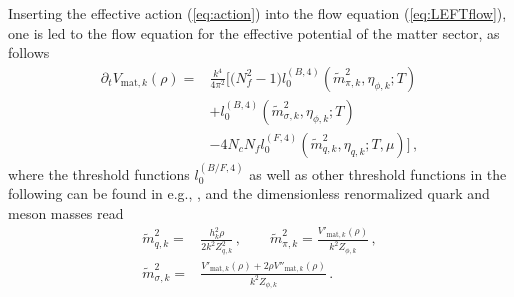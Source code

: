 \documentclass[%
reprint,
superscriptaddress,
showpacs,preprintnumbers,
amsmath,amssymb,
aps,
prd,
]{revtex4-1}
\def\eq#1{(\ref{#1})}
\begin{document}
	Inserting the effective action \eq{eq:action} into the flow equation \eq{eq:LEFTflow}, one is led to the flow equation for the effective potential of the matter sector, as follows
	\begin{align}
		\partial_t V_{\mathrm{mat},k}(\rho)=&\frac{k^4}{4\pi^2} \bigg [\big(N^2_f-1\big) l^{(B,4)}_{0}(\tilde{m}^{2}_{\pi,k},\eta_{\phi,k};T)\nonumber\\[2ex]
		&+l^{(B,4)}_{0}(\tilde{m}^{2}_{\sigma,k},\eta_{\phi,k};T)\nonumber\\[2ex]
		&-4N_c N_f l^{(F,4)}_{0}(\tilde{m}^{2}_{q,k},\eta_{q,k};T,\mu)\bigg]\,, \label{eq:flowV}
	\end{align}
	where the threshold functions $l^{(B/F,4)}_{0}$ as well as other threshold functions in the following can be found in e.g., \cite{Fu:2019hdw,Yin:2019ebz}, and the dimensionless renormalized quark and meson masses read
	\begin{align}
		\tilde{m}^{2}_{q,k}=&\frac{h^{2}_{k}\rho}{2k^2Z^{2}_{q,k}}\,, \qquad \tilde{m}^{2}_{\pi,k}=\frac{V'_{\mathrm{mat},k}(\rho)}{k^2 Z_{\phi,k}}\,, \\[2ex]
		\tilde{m}^{2}_{\sigma,k}=&\frac{V'_{\mathrm{mat},k}(\rho)+2\rho V''_{\mathrm{mat},k}(\rho)}{k^2 Z_{\phi,k}}\,.\label{}
	\end{align}
	
\end{document}

